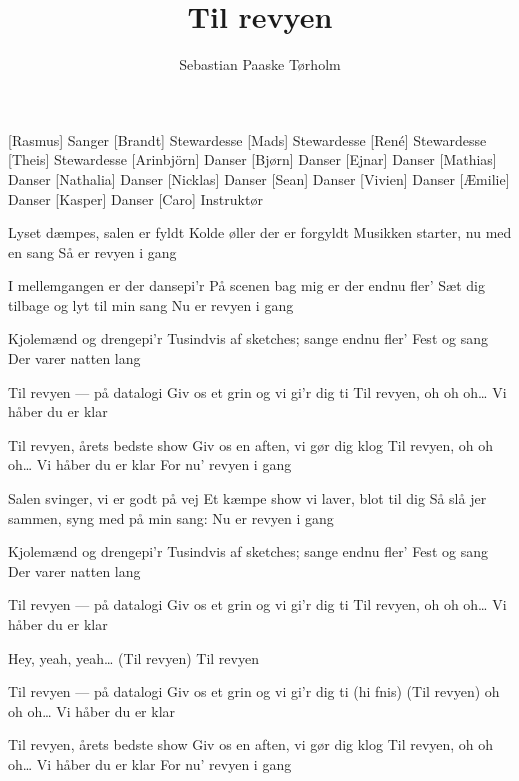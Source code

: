 \documentclass[a4paper,11pt]{article}
\title{Til revyen}
\author{Sebastian Paaske Tørholm}
\begin{document}
\maketitle

\begin{roles}
[Rasmus] Sanger
[Brandt] Stewardesse
[Mads] Stewardesse
[René] Stewardesse
[Theis] Stewardesse
[Arinbjörn] Danser
[Bjørn] Danser
[Ejnar] Danser
[Mathias] Danser
[Nathalia] Danser
[Nicklas] Danser
[Sean] Danser
[Vivien] Danser
[Æmilie] Danser
[Kasper] Danser
[Caro] Instruktør
\end{roles}

\begin{song}


%
Lyset dæmpes, salen er fyldt
Kolde øller der er forgyldt
Musikken starter, nu med en sang
Så er revyen i gang

I mellemgangen er der dansepi'r
På scenen bag mig er der endnu fler'
Sæt dig tilbage og lyt til min sang
Nu er revyen i gang

Kjolemænd og drengepi'r
Tusindvis af sketches; sange endnu fler'
Fest og sang
Der varer natten lang

Til revyen --- på datalogi
Giv os et grin og vi gi'r dig ti
Til revyen, oh oh oh\ldots
Vi håber du er klar

Til revyen, årets bedste show
Giv os en aften, vi gør dig klog
Til revyen, oh oh oh\ldots
Vi håber du er klar
For nu' revyen i gang

Salen svinger, vi er godt på vej
Et kæmpe show vi laver, blot til dig
Så slå jer sammen, syng med på min sang:
Nu er revyen i gang

Kjolemænd og drengepi'r
Tusindvis af sketches; sange endnu fler'
Fest og sang
Der varer natten lang

Til revyen --- på datalogi
Giv os et grin og vi gi'r dig ti
Til revyen, oh oh oh\ldots
Vi håber du er klar

Hey, yeah, yeah\ldots
(Til revyen)
Til revyen

Til revyen --- på datalogi
Giv os et grin og vi gi'r dig ti (hi fnis)
(Til revyen) oh oh oh\ldots
Vi håber du er klar

Til revyen, årets bedste show
Giv os en aften, vi gør dig klog
Til revyen, oh oh oh\ldots
Vi håber du er klar
For nu' revyen i gang


\end{song}
\end{document}

